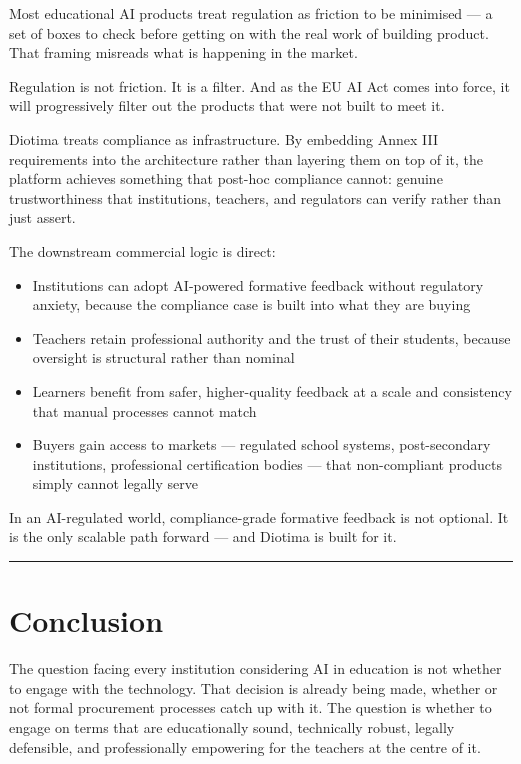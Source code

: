 \documentclass[11pt, a4paper]{article}
\begin{document}
Most educational AI products treat regulation as friction to be minimised --- a set of boxes to check before getting on with the real work of building product. That framing misreads what is happening in the market.

Regulation is not friction. It is a filter. And as the EU AI Act comes into force, it will progressively filter out the products that were not built to meet it.

Diotima treats compliance as infrastructure. By embedding Annex III requirements into the architecture rather than layering them on top of it, the platform achieves something that post-hoc compliance cannot: genuine trustworthiness that institutions, teachers, and regulators can verify rather than just assert.

The downstream commercial logic is direct:

\begin{itemize}
  \item Institutions can adopt AI-powered formative feedback without regulatory anxiety, because the compliance case is built into what they are buying
  \item Teachers retain professional authority and the trust of their students, because oversight is structural rather than nominal
  \item Learners benefit from safer, higher-quality feedback at a scale and consistency that manual processes cannot match
  \item Buyers gain access to markets --- regulated school systems, post-secondary institutions, professional certification bodies --- that non-compliant products simply cannot legally serve
\end{itemize}

In an AI-regulated world, compliance-grade formative feedback is not optional. It is the only scalable path forward --- and Diotima is built for it.

\bigskip
{\color{navy}\rule{\textwidth}{1pt}}
\bigskip

\section*{Conclusion}

The question facing every institution considering AI in education is not whether to engage with the technology. That decision is already being made, whether or not formal procurement processes catch up with it. The question is whether to engage on terms that are educationally sound, technically robust, legally defensible, and professionally empowering for the teachers at the centre of it.
\end{document}

